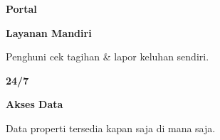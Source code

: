 \documentclass[a4paper]{article}
\begin{document}
\begin{minipage}[t]{0.485\textwidth}
    \noindent\colorbox{BlueBg}{%
        \begin{minipage}[t][2.7cm][c]{\dimexpr\linewidth-2\fboxsep\relax}
            \centering
            {\fontsize{20}{24}\selectfont\bfseries\color{BluePrimary} Portal}\par\vspace{2pt}
            {\fontsize{9.5}{12}\selectfont\bfseries\color{BlueDark} Layanan Mandiri}\par\vspace{2pt}
            {\fontsize{8.5}{11}\selectfont\color{TextDark}Penghuni cek tagihan \& lapor keluhan sendiri.}
        \end{minipage}}\par
    \vspace{6pt}
    \noindent\colorbox{BlueBg}{%
        \begin{minipage}[t][2.7cm][c]{\dimexpr\linewidth-2\fboxsep\relax}
            \centering
            {\fontsize{20}{24}\selectfont\bfseries\color{BluePrimary} 24/7}\par\vspace{2pt}
            {\fontsize{9.5}{12}\selectfont\bfseries\color{BlueDark} Akses Data}\par\vspace{2pt}
            {\fontsize{8.5}{11}\selectfont\color{TextDark}Data properti tersedia kapan saja di mana saja.}
        \end{minipage}}%
\end{minipage}

\vspace{8pt}
\end{document}
